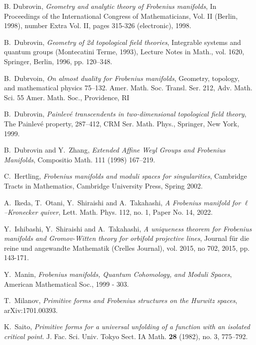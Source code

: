 \documentclass[a4paper,11pt]{jbook}
\theoremstyle{plain}
\theoremstyle{definition}
\theoremstyle{remark}
\theoremstyle{proof}
\numberwithin{equation}{section}
\begin{document}
\begin{thebibliography}{99}
{\small



B. Dubrovin,
{\it Geometry and analytic theory of Frobenius manifolds},
In Proceedings of the International Congress of Mathematicians, Vol. II (Berlin, 1998), number Extra Vol. II, pages 315-326 (electronic), 1998.

B.~Dubrovin,
{\it Geometry of 2d topological field theories},
Integrable systems and quantum groups
(Montecatini Terme, 1993), Lecture Notes in Math., vol. 1620, Springer, Berlin, 1996, pp. 120--348.

B.~Dubrvoin,
{\it On almost duality for Frobenius manifolds},
Geometry, topology, and mathematical physics 75–132. Amer. Math. Soc. Transl. Ser. 212, Adv. Math. Sci. 55 Amer. Math. Soc., Providence, RI

B.~Dubrovin,
{\it Painlevé transcendents in two-dimensional topological field theory},
The Painlevé property, 287–412, CRM Ser. Math. Phys., Springer, New York, 1999.

B.~Dubrovin and Y.~Zhang,
{\it Extended Affine Weyl Groups and Frobenius Manifolds},
Compositio Math. 111 (1998) 167--219.

C.~Hertling,
{\it Frobenius manifolds and moduli spaces for singularities},
Cambridge Tracts in Mathematics, Cambridge University Press, Spring 2002.

A.~Ikeda, T.~Otani, Y.~Shiraishi and A.~Takahashi,
{\it A Frobenius manifold for $\ell$--Kronecker quiver},
Lett. Math. Phys. 112, no. 1, Paper No. 14, 2022.

Y.~Ishibashi, Y.~Shiraishi and A.~Takahashi,
{\it A uniqueness theorem for Frobenius manifolds and Gromov-Witten theory for orbifold projective lines},
Journal für die reine und angewandte Mathematik (Crelles Journal), vol. 2015, no 702, 2015, pp. 143-171.

Y.~Manin,
{\it Frobenius manifolds, Quantum Cohomology, and Moduli Spaces},
American Mathematical Soc., 1999 - 303.

T.~Milanov,
{\it Primitive forms and Frobenius structures on the Hurwitz spaces},
arXiv:1701.00393.

K.~Saito,
{\it Primitive forms for a universal unfolding of a function with an isolated critical point}.
J. Fac. Sci. Univ. Tokyo Sect. IA Math. {\bf 28} (1982), no. 3, 775--792.

}
\end{thebibliography}
\end{document}
